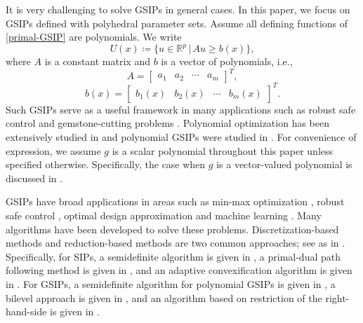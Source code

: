 \documentclass{amsart}
\theoremstyle{plain}
\newcommand{\re}{\mathbb{R}}
\newcommand{\be}{\begin{equation}}
\newcommand{\ee}{\end{equation}}
\newcommand{\bbm}{\begin{bmatrix}}
\newcommand{\ebm}{\end{bmatrix}}
\numberwithin{equation}{section}
\begin{document}
	
	It is very challenging to solve GSIPs in general cases. 
	In this paper, we focus on GSIPs defined with polyhedral parameter sets.
	Assume all defining functions of \eqref{primal-GSIP} are polynomials. 
	We write
	\be \label{U(x)set}
	U(x) \coloneqq  \{u\in\re^p\,\vert\, Au \ge b(x)\},
	\ee
	where $A$ is a constant matrix and $b$ is a vector of polynomials, i.e.,
	\[ A = \bbm a_1 & a_2 & \cdots & a_m\ebm^T,\]
	\[ b(x) = \bbm b_1(x) & b_2(x) & \cdots & b_m(x)\ebm^T.\]
	Such GSIPs serve as a useful framework in many applications such as
	robust safe control \cite{wei2022persistently,WehbSip24} and 
	gemstone-cutting problems \cite{kufer2008semi,nguyen1992computing,winterfeld2008application}.
	Polynomial optimization has been extensively studied in \cite{Las01,NieBook}
	and polynomial GSIPs were studied in \cite{HuNie23,wang2014semidefinite}.
	For convenience of expression, we assume $g$ is a scalar polynomial throughout 
    this paper unless specified otherwise. 
    Specifically, the case when $g$ is a vector-valued polynomial is discussed in .
	
	
	
	
	
	GSIPs have broad applications in areas such as min-max optimization \cite{PangWu2020},
	robust safe control \cite{wei2022persistently,WehbSip24}, 	
	optimal design approximation \cite{royset2003adaptive} and
	machine learning \cite{sra2012optimization,xu2009robustness}.
	Many algorithms have been developed to solve these problems.
	Discretization-based methods and reduction-based methods are two common approaches; 
	see as in \cite{Cerulli22,Hettichdis,Hettichsip,Still2001}.
	Specifically, for SIPs, a semidefinite algorithm is given in \cite{wang2014semidefinite},
	a primal-dual path following method is given in \cite{OkunoFukushima23},
	and an adaptive convexification algorithm is given in \cite{stein2012adaptive}.
	For GSIPs, a semidefinite algorithm for polynomial GSIPs is given in \cite{HuNie23},
	a bilevel approach is given in \cite{stein2003bi}, 
	and an algorithm based on restriction of the right-hand-side is given in \cite{articleAngelos2015}.
	
\end{document}
